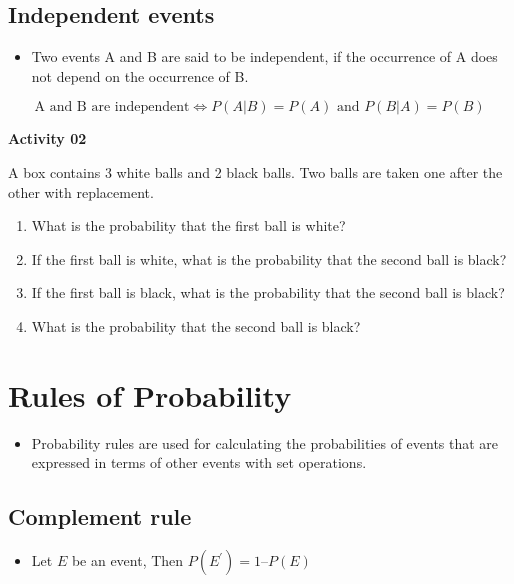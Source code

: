 \documentclass[]{book}
\providecommand{\tightlist}{%
  \setlength{\itemsep}{0pt}\setlength{\parskip}{0pt}}
\begin{document}
\hypertarget{independent-events}{%
\subsection{Independent events}\label{independent-events}}

\begin{itemize}
\tightlist
\item
  Two events A and B are said to be independent, if the occurrence of A does not depend on the occurrence of B.
\end{itemize}

\[\text{A and B are independent} \iff P(A|B) = P(A) \text{ and } P(B|A) = P(B)\]

\textbf{Activity 02}

A box contains 3 white balls and 2 black balls. Two balls are taken one after the other with replacement.

\begin{enumerate}
\def\labelenumi{\alph{enumi})}
\tightlist
\item
  What is the probability that the first ball is white?
\item
  If the first ball is white, what is the probability that the second ball is black?
\item
  If the first ball is black, what is the probability that the second ball is black?
\item
  What is the probability that the second ball is black?
\end{enumerate}

\hypertarget{rules-of-probability}{%
\section{Rules of Probability}\label{rules-of-probability}}

\begin{itemize}
\tightlist
\item
  Probability rules are used for calculating the probabilities of events that are expressed in terms of other events with set operations.
\end{itemize}

\hypertarget{complement-rule}{%
\subsection{Complement rule}\label{complement-rule}}

\begin{itemize}
\tightlist
\item
  Let \(E\) be an event, Then \(P(E^\prime) = 1 –P(E)\)
\end{itemize}
\end{document}
